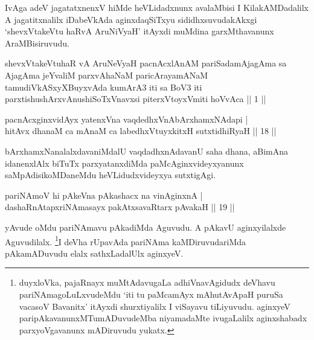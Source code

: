 \begin{artha}
IvAga adeV jagatatxnenxV hiMde heVLidadxnunx avalaMbisi I KilakAMDadalilx A jagatitxnalilx iDabeVkAda aginxdaqSiTxyu sididhxsuvudakAkxgi `shevxVtakeVtu haRvA AruNiVyaH' itAyxdi muMdina garxMthavanunx AraMBisiruvudu.
\end{artha}

\begin{kandikeshl}
shevxVtakeVtuhaR vA AruNeVyaH pacnAcxlAnAM pariSadamAjagAma sa AjagAma jeYvaliM parxvAhaNaM paricArayamANaM tamudiVkASxyXBuyxvAda kumArA3 iti sa BoV3 iti parxtishushArxvAnushiSoTxV\s navxsi piterxVtoyxVmiti hoVvAca || 1 ||
\end{kandikeshl}


\begin{shl}
pacnAcxginxvidAyx yatenxVna vaqdedhxVnAbArxhamxNAdapi | \\
hitAvx dhanaM ca mAnaM ca labedhxVtuyxkitxH sutxtidhiRyaH \hfill|| 18 || 
\end{shl}

\begin{artha}
bArxhamxNanalalxdavaniMdalU vaqdadhxnAdavanU saha dhana, aBimAna idanenxlAlx biTuTx parxyatanxdiMda paMcAginxvideyxyanunx saMpAdisikoMDaneMdu heVLidudx\break videyxya sutxtigAgi.
\end{artha}


\begin{shl}
pariNAmoV hi pAkeVna pAkashacx na vinA\s ginxnA | \\
dashaRnAtapxriNAmasayx pakAtxsavaRtarx pAvakaH \hfill|| 19 || 
\end{shl}

\begin{artha}
yAvude oMdu pariNAmavu pAkadiMda Aguvudu. A pAkavU aginxyilalxde 
Aguvudilalx. \footnote{duyxloVka, pajaRnayx muMtAdavugaLa 
adhiVnavAgidudx deVhavu pariNAmagoLuLxvudeMdu `iti tu paMcamAyx mAhutAvApaH puruSa vacasoV Bavanitx' itAyxdi 
shurxtiyalilx I viSayavu tiLiyuvudu. aginxyeV 
paripAkavanunxMTumADuvudeMba niyamadaMte ivugaLalilx aginxshabadx 
parxyoVgavanunx mADiruvudu yukatx.}I deVha rUpavAda pariNAma kaMDiruvudariMda 
pAkamADuvudu elalx sathxLadalUlx aginxyeV.
\end{artha}

\centerline{}

